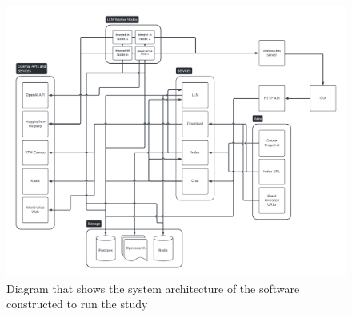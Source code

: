 \begin{figure}[H]
    \centering
    \includegraphics[width=\textwidth]{content/figures/assets/06-system-architecture-diagram.pdf}
    \caption{Diagram that shows the system architecture of the software constructed to run the study}
    \label{fig:system_architecture_diagram}
\end{figure}
